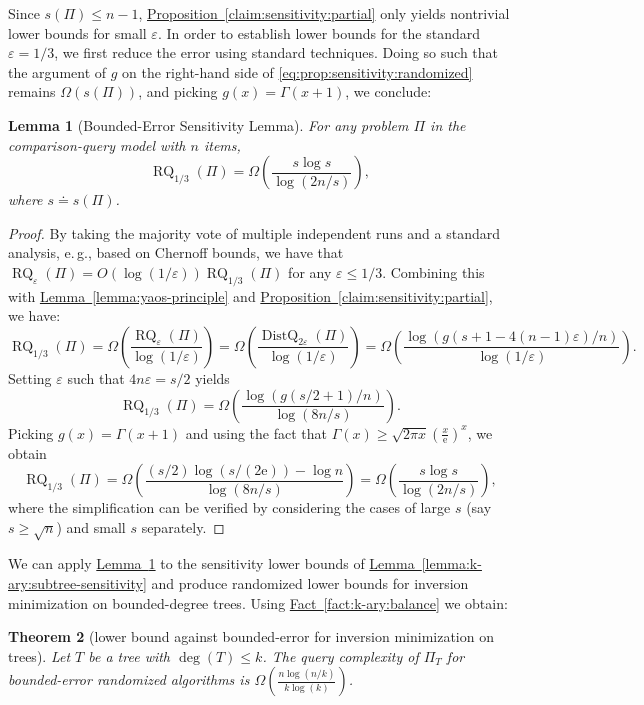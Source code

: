 \documentclass[11pt]{article}
\numberwithin{equation}{section}
\newtheorem{theorem}{Theorem}[section]
\newtheorem{lemma}[theorem]{Lemma}
\theoremstyle{definition}
\theoremstyle{plain}
\newcommand{\eee}{\mathrm e}
\newcommand{\eg}{e.\,g.}
\newcommand{\expref}[2]{\hyperref[#2]{#1~\ref{#2}}}
\DeclareMathOperator{\DistQ}{DistQ}
\DeclareMathOperator{\RQ}{RQ}
\newcommand{\eps}{\varepsilon}
\begin{document}
Since $s(\Pi) \le n-1$, \expref{Proposition}{claim:sensitivity:partial} only yields nontrivial lower bounds for small $\eps$. In order to establish lower bounds for the standard $\eps=1/3$, we first reduce the error using standard techniques. Doing so such that the argument of $g$ on the right-hand side of \eqref{eq:prop:sensitivity:randomized} remains $\Omega(s(\Pi))$, and picking $g(x)=\Gamma(x+1)$, we conclude:

\begin{lemma}[Bounded-Error Sensitivity Lemma]
\label{lemma:randomized-sensitivity}
For any problem $\Pi$ in the comparison-query model with $n$ items, 
\[\RQ_{1/3}(\Pi) = \Omega \left(\frac{s \log s}{\log(2n/s)} \right), \]
where $s \doteq s(\Pi)$.
\end{lemma}

\begin{proof}
By taking the majority vote of multiple independent runs and a standard analysis, \eg, based on Chernoff bounds, we have that $\RQ_\eps(\Pi) = O(\log(1/\eps)) \RQ_{1/3}(\Pi)$ for any $\eps \le 1/3$. Combining this with \expref{Lemma}{lemma:yaos-principle} and \expref{Proposition}{claim:sensitivity:partial}, we have:
\[\RQ_{1/3}(\Pi) = \Omega \left( \frac{\RQ_{\eps}(\Pi)}{\log(1/\eps)} \right) = \Omega \left(  \frac{\DistQ_{2\eps}(\Pi)}{\log(1/\eps)} \right) =  \Omega \left( \frac{\log(g(s+1-4(n-1)\eps)/n)}{\log(1/\eps)}\right). \]
Setting $\eps$ such that $4n\eps = s/2$ yields
\[\RQ_{1/3}(\Pi) =  \Omega \left( \frac{\log(g(s/2+1)/n)}{\log(8n/s)}\right).
\]
Picking $g(x)=\Gamma(x+1)$ and using the fact that $\Gamma(x) \ge \sqrt{2\pi x} \left(\frac{x}{\eee}\right)^x$, %
we obtain
\[\RQ_{1/3}(\Pi) =  \Omega \left( \frac{(s/2)\log(s/(2\eee)) - \log n}{\log(8n/s)}\right) = \Omega \left( \frac{s\log s }{\log(2n/s)}\right),
\]
where the simplification can be verified by considering the cases of large $s$ (say $s \ge \sqrt{n}$) and small $s$ separately. 
\end{proof}

We can apply \expref{Lemma}{lemma:randomized-sensitivity} to the sensitivity lower bounds of \expref{Lemma}{lemma:k-ary:subtree-sensitivity} and produce randomized lower bounds for inversion minimization on bounded-degree trees. Using \expref{Fact}{fact:k-ary:balance} we obtain: 

\begin{theorem}[lower bound against bounded-error 
for inversion minimization on trees]
	Let $T$ be a tree with $\deg(T)\le k$. The query complexity of $\Pi_T$ for bounded-error randomized algorithms is $\Omega(\frac{n\log(n/k)}{k\log(k)})$.
\end{theorem}
\end{document}
